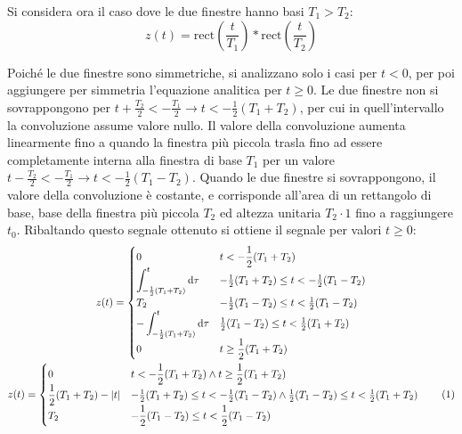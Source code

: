 \documentclass{article}
\newcommand{\rect}{\mathrm{rect}}
\newcommand{\df}{\mathrm{d}}
\newcommand{\tageq}{\tag{\stepcounter{equation}\theequation}}
\begin{document}
Si considera ora il caso dove le due finestre hanno basi $T_1>T_2$:
\begin{equation*}
    z(t)=\rect\left(\displaystyle\frac{t}{T_1}\right)*\rect\left(\frac{t}{T_2}\right)
\end{equation*}

Poiché le due finestre sono simmetriche, si analizzano solo i casi per $t<0$, per poi aggiungere per simmetria l'equazione analitica per $t\geq0$. Le due finestre non si 
sovrappongono per $t+\displaystyle\frac{T_2}{2}<-\frac{T_1}{2}\to t<-\frac{1}{2}(T_1+T_2)$, per cui in quell'intervallo la convoluzione assume valore nullo. Il valore 
della convoluzione aumenta linearmente fino a quando la finestra più piccola trasla fino ad essere completamente interna alla finestra di base $T_1$ per un valore 
$t-\displaystyle\frac{T_2}{2}<-\frac{T_1}{2}\to t<-\frac{1}{2}(T_1-T_2)$. Quando le due finestre si sovrappongono, il valore della convoluzione è costante, e corrisponde 
all'area di un rettangolo di base, base della finestra più piccola $T_2$ ed altezza unitaria $T_2\cdot1$ fino a raggiungere $t_0$. Ribaltando questo segnale ottenuto 
si ottiene il segnale per valori $t\geq0$:
\begin{gather*}
    z(t)=\begin{cases}
        0&t<-\displaystyle\frac{1}{2}(T_1+T_2)\\
        \displaystyle\int_{-\frac{1}{2}(T_1+T_2)}^t\df\tau&-\frac{1}{2}(T_1+T_2)\leq t <-\frac{1}{2}(T_1-T_2)\\
        T_2&-\frac{1}{2}(T_1-T_2)\leq t<\frac{1}{2}(T_1-T_2)\\
        -\displaystyle\int_{-\frac{1}{2}(T_1+T_2)}^t\df\tau&\frac{1}{2}(T_1-T_2)\leq t <\frac{1}{2}(T_1+T_2)\\
        0&t\geq\displaystyle\frac{1}{2}(T_1+T_2)
    \end{cases}\\
    z(t)=\begin{cases}
        0&t<-\displaystyle\frac{1}{2}(T_1+T_2)\land t\geq\frac{1}{2}(T_1+T_2)\\
        \displaystyle\frac{1}{2}(T_1+T_2)-|t| &-\frac{1}{2}(T_1+T_2)\leq t <-\frac{1}{2}(T_1-T_2)\land \frac{1}{2}(T_1-T_2)\leq t <\frac{1}{2}(T_1+T_2)\\
        T_2&-\displaystyle\frac{1}{2}(T_1-T_2)\leq t<\frac{1}{2}(T_1-T_2)
    \end{cases}\tageq
\end{gather*}
\end{document}
